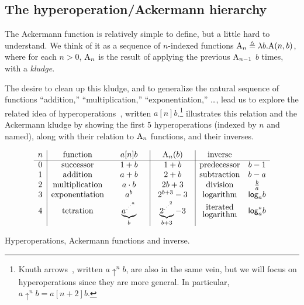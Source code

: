 \subsection{The hyperoperation/Ackermann hierarchy}

The Ackermann function is relatively simple to define, but a little hard to 
understand.  {\color{magenta}We think of it as} 
a sequence of $n$-indexed functions $\text{A}_n \triangleq \lambda b.\text{A}(n,b)$, where for each $n>0$, $\text{A}_n$ is the result of applying the previous $\text{A}_{n-1}$ $b$ times, with a \emph{kludge}.

The desire to clean up this kludge, and to generalize the natural sequence
of functions ``addition,'' ``multiplication,'' ``exponentiation,'' \ldots,
lead us to explore the related idea of hyperoperations~\cite{goodstein},
written $a [n] b$.\footnote{Knuth arrows~\cite{knuth}, written $a \uparrow^n b$,
are also in the same vein, but we will focus on hyperoperations 
since they are more general. In particular, $a \uparrow^n b = a[n+2]b$.}
 illustrates this relation and the Ackermann kludge
by {\color{magenta}showing the first 5 hyperoperations (indexed by $n$ and named), 
along with their relation to $\text{A}_n$ functions, and their inverses.}
\begin{table}[h]
	\[
\begin{array}{c|cc|c|cc}
n & \text{function} & \quad a [n] b \quad & \quad \Ack_n(b) \quad & \text{inverse} \\
\hline
0 & \text{successor} & 1 + b & 1 + b & \text{predecessor} & b - 1 \\
1 & \text{addition} & a + b & 2 + b & \text{subtraction} & b - a \\
2 & \text{multiplication} & a \cdot b & 2b + 3 & \text{division} & \frac{b}{a}\\
3 & \text{exponentiation} & a^b & 2^{b + 3} - 3 & \text{logarithm} & \mathsf{log}_a b \\
[2pt]
4 & \text{tetration} & \underbrace{a^{.^{.^{.^a}}}}_b & \underbrace{2^{.^{.^{.^2}}}}_{b+3} - 3 & \begin{array}{@{}c@{}}\text{iterated}\\[-3pt]\text{logarithm}\end{array} & \mathsf{log}^*_a b
\end{array}
\] \caption{Hyperoperations, Ackermann functions and inverse.}
\label{table: hyperop-ack-inv}
\end{table}

